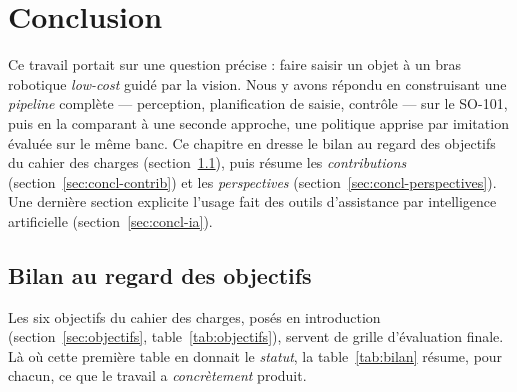 \chapter{Conclusion}
\label{ch:conclusion}

Ce travail portait sur une question précise : faire saisir un objet à un bras robotique \emph{low-cost} guidé par la vision. Nous y avons répondu en construisant une \emph{pipeline} complète --- perception, planification de saisie, contrôle --- sur le SO-101, puis en la comparant à une seconde approche, une politique apprise par imitation évaluée sur le même banc. Ce chapitre en dresse le bilan au regard des objectifs du cahier des charges (section~\ref{sec:concl-bilan}), puis résume les \emph{contributions} (section~\ref{sec:concl-contrib}) et les \emph{perspectives} (section~\ref{sec:concl-perspectives}). Une dernière section explicite l'usage fait des outils d'assistance par intelligence artificielle (section~\ref{sec:concl-ia}).

\section{Bilan au regard des objectifs}
\label{sec:concl-bilan}

Les six objectifs du cahier des charges, posés en introduction (section~\ref{sec:objectifs}, table~\ref{tab:objectifs}), servent de grille d'évaluation finale. Là où cette première table en donnait le \emph{statut}, la table~\ref{tab:bilan} résume, pour chacun, ce que le travail a \emph{concrètement} produit.

